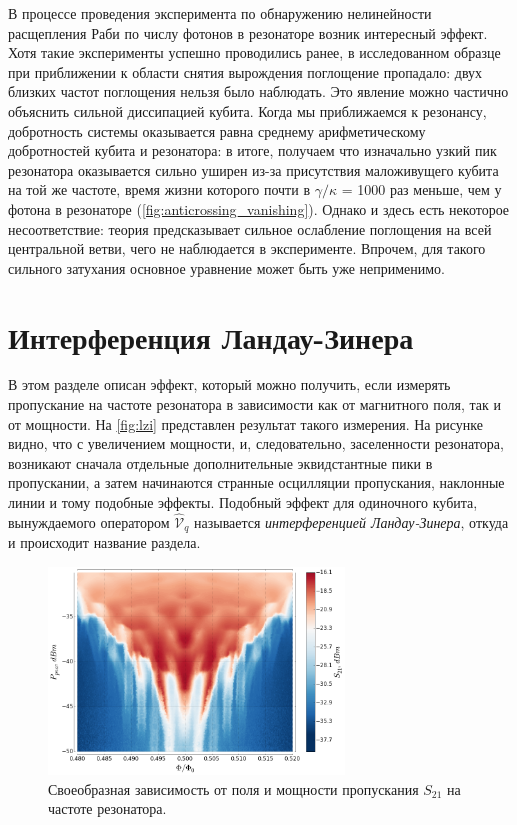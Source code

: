 \documentclass[12pt, twoside]{report}
\numberwithin{equation}{section}
\numberwithin{figure}{section}
\begin{document}
В процессе проведения эксперимента по обнаружению нелинейности расщепления Раби по числу фотонов в резонаторе возник интересный эффект. Хотя такие эксперименты успешно проводились ранее\cite{bishop2009}, в исследованном образце при приближении к области снятия вырождения поглощение пропадало: двух близких частот поглощения нельзя было наблюдать. Это явление можно частично объяснить сильной диссипацией кубита. Когда мы приближаемся к резонансу, добротность системы оказывается равна среднему арифметическому добротностей кубита и резонатора\cite{Blais2004}: в итоге, получаем что изначально узкий пик резонатора оказывается сильно уширен из-за присутствия маложивущего кубита на той же частоте, время жизни которого почти в $\gamma/\kappa$ = 1000 раз меньше, чем у фотона в резонаторе (\autoref{fig:anticrossing_vanishing}). Однако и здесь есть некоторое несоответствие: теория предсказывает сильное ослабление поглощения на всей центральной ветви, чего не наблюдается в эксперименте. Впрочем, для такого сильного затухания основное уравнение может быть уже неприменимо.

\section{Интерференция Ландау-Зинера}

В этом разделе описан эффект, который можно получить, если измерять пропускание на частоте резонатора в зависимости как от магнитного поля, так и от мощности. На \autoref{fig:lzi} представлен результат такого измерения. На рисунке видно, что с увеличением мощности, и, следовательно, заселенности резонатора, возникают сначала отдельные дополнительные эквидстантные пики в пропускании, а затем начинаются странные осцилляции пропускания, наклонные линии и тому подобные эффекты.  Подобный эффект для одиночного кубита, вынуждаемого оператором $\mathcal{\hat V}_q$\cite{oliver2009} называется \textit{интерференцией Ландау-Зинера}, откуда и происходит название раздела.

\begin{figure}[h]
\centering
\includegraphics[width=0.7\textwidth]{Pictures/LZI}
\caption{Своеобразная зависимость от поля и мощности пропускания $S_{21}$ на частоте резонатора.}
\label{fig:lzi}
\end{figure}
\end{document}
